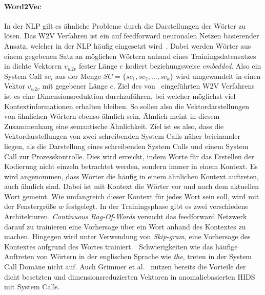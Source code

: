             \paragraph{Word2Vec}
                In der \ac{NLP} gilt es ähnliche Probleme durch die Darstellungen der Wörter zu lösen.
                Das \ac{W2V} Verfahren ist ein auf feedforward neuronalen Netzen basierender Ansatz, welcher in der \ac{NLP} häufig eingesetzt wird~\cite{W2VAYYADEVARA2018}.
                Dabei werden Wörter aus einem gegebenen Satz an möglichen Wörtern anhand eines Trainingsdatensatzes in dichte Vektoren $v_{w2v}$ fester Länge $e$ kodiert beziehungsweise \textit{embedded}.
                Also ein System Call $sc_i$ aus der Menge $SC = \{sc_1,sc_2,\dots,sc_k\}$ wird umgewandelt in einen Vektor $v_{w2v}$ mit gegebener Länge $e$.
                Ziel des von~\cite{W2VMIKOLOV2013} eingeführten \ac{W2V} Verfahrens ist es eine Dimensionsreduktion durchzuführen, bei welcher möglichst viel Kontextinformationen erhalten bleiben.
                So sollen also die Vektordarstellungen von ähnlichen Wörtern ebenso ähnlich sein.
                Ähnlich meint in diesem Zusammenhang eine semantische Ähnlichkeit.
                Ziel ist es also, dass die Vektordarstellungen von zwei schreibenden System Calls näher beieinander liegen, als die Darstellung eines schreibenden System Calls und einem System Call zur Prozesskontrolle. 
                Dies wird erreicht, indem Worte für das Erstellen der Kodierung nicht einzeln betrachtet werden, sondern immer in einem Kontext.
                Es wird angenommen, dass Wörter die häufig in einem ähnlichen Kontext auftreten, auch ähnlich sind.
                Dabei ist mit Kontext die Wörter vor und nach dem aktuellen Wort gemeint.
                Wie umfangreich dieser Kontext für jedes Wort sein soll, wird mit der Fenstergröße $w$ festgelegt.
                In der Trainingsphase gibt es zwei verschiedene Architekturen.
                \textit{Continuous Bag-Of-Words} versucht das feedforward Netzwerk darauf zu trainieren eine Vorhersage über ein Wort anhand des Kontextes zu machen.
                Hingegen wird unter Verwendung von \textit{Skip-gram}, eine Vorhersage des Kontextes aufgrund des Wortes trainiert.~\cite{EMBEDDINGPILEHVAR2020}
                Schwierigkeiten wie das häufige Auftreten von Wörtern in der englischen Sprache wie \textit{the}, treten in der System Call Domäne nicht auf.
                Auch Grimmer et al.~\cite{IDSTHREADGRIMMER2021} nutzen bereits die Vorteile der dicht besetzten und dimensionsreduzierten Vektoren in anomaliebasierten \ac{HIDS} mit System Calls.

